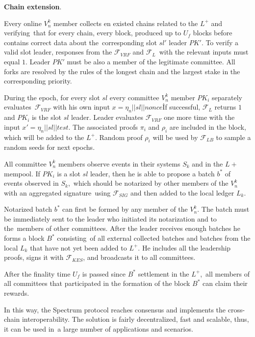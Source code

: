 \begin{legal}
    \item \textbf{Chain extension}.
    \begin{legal}

        \item Every online $V^k_n$ member collects en existed chains related to the $L^+$ and verifying\
        that for every chain, every block, produced up to $U_f$ blocks before contains correct data about the\
        corresponding slot $sl'$ leader $PK'$.
        To verify a valid slot leader, responses from the ${\mathcal{F}}_{VRF}$ and ${\mathcal{F}}_{L}$\
        with the relevant inputs must equal $1$.
        Leader $PK'$ must be also a member of the legitimate committee.
        All forks are resolved by the rules of the longest chain and the largest stake in the corresponding priority.

        \item During the epoch, for every slot $sl$ every committee $V^k_n$ member $PK_i$ separately evaluates\
        ${\mathcal{F}}_{VRF}$ with his own input ${x = \eta_n || sl || \textit{nonce}}$\.
        If successful, ${\mathcal{F}}_{L}$ returns $1$ and $PK_i$ is the slot $sl$ leader.
        Leader evaluates ${\mathcal{F}}_{VRF}$ one more time with the input ${x' = \eta_n || sl || \textit{test}}$.
        The associated proofs $\pi_i$ and $\rho_i$ are included in the block, which will be added to the $L^+$.
        Random proof $\rho_i$ will be used by ${\mathcal{F}}_{LB}$ to sample a random seeds for next epochs.

        \item All committee $V^k_n$ members observe events in their systems $S_k$ and in the $L+$ mempool.
        If $PK_i$ is a slot $sl$ leader, then he is able to propose a batch $b^*$ of events observed in $S_k$,\
        which should be notarized by other members of the $V^k_n$ with an aggregated signature\
        using ${\mathcal{F}}_{SIG}$ and then added to the local ledger $L_k$.

        \item Notarized batch $b^*$ can first be formed by any member of the $V^k_n$.
        The batch must be immediately sent to the leader who initiated its notarization and to the\
        members of other committees.
        After the leader receives enough batches he forms a block  $B^*$ consisting\
        of all external collected batches and batches from the local $L_k$ that have not yet been added to $L^+$.
        He includes all the leadership proofs, signs it with ${\mathcal{F}}_{KES}$, and broadcasts it to all committees.

        \item After the finality time $U_f$ is passed since $B^*$ settlement in the $L^+$,\
        all members of all committees that participated in the formation of the block $B^*$ can claim their rewards.
    \end{legal}
\end{legal}

In this way, the Spectrum protocol reaches consensus and implements the cross-chain interoperability.
The solution is fairly decentralized, fast and scalable, thus, it can be used in\
a large number of applications and scenarios.